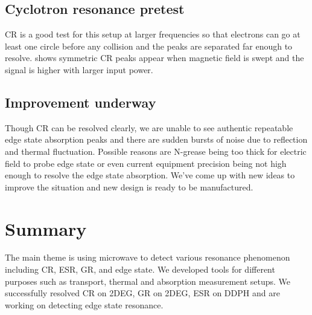 \documentclass[12pt]{ruthesis}
\begin{document}
 


 
 
\section{Cyclotron resonance pretest}\label{Cyclotron}

CR is a good test for this setup at larger frequencies so that electrons can go at least one circle before any collision and the peaks are separated far enough to resolve. 
 shows symmetric CR peaks appear when magnetic field is swept and the signal is higher with larger input power.  









\section{Improvement underway}\label{Improvement}

Though CR can be resolved clearly, we are unable to see authentic repeatable edge state absorption peaks
and there are sudden bursts of noise due to reflection and thermal fluctuation.
Possible reasons are N-grease being too thick for electric field to probe edge state or even current equipment precision being not high enough to resolve the edge state absorption. 
We've come up with new ideas to improve the situation and new design is ready to be manufactured. 





\chapter{Summary}\label{summary}

The main theme is using microwave to detect various resonance phenomenon including CR, ESR, GR, and edge state.
We developed tools for different purposes such as transport, thermal and absorption measurement setups.
We successfully resolved CR on 2DEG, GR on 2DEG, ESR on DDPH and are working on detecting edge state resonance. 



\appendix



\end{document}
